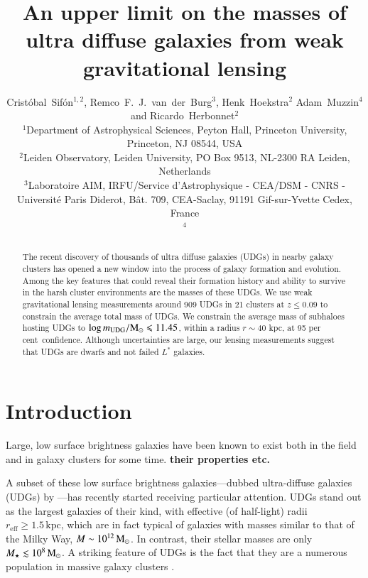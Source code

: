 \documentclass[usenatbib,fleqn]{mnras}
\title[Weak lensing masses of UDGs]{An upper limit on the masses of ultra diffuse galaxies from weak gravitational lensing}
\author[C.\ Sif\'on, R.\ F.\ J.\ van der Burg, H.\ Hoekstra, A.\ Muzzin \& R.\ Herbonnet]
  {
      Crist\'obal~Sif\'on$^{1,2}$,
      Remco~F.~J.~van~der~Burg$^3$,
      Henk~Hoekstra$^2$
      Adam~Muzzin$^4$
      and
      \newauthor
      Ricardo~Herbonnet$^2$
\\
      $^1$Department of Astrophysical Sciences, Peyton Hall, Princeton University, Princeton, NJ 08544, USA\\
      $^2$Leiden Observatory, Leiden University, PO Box 9513, NL-2300 RA Leiden, Netherlands\\
      $^3$Laboratoire AIM, IRFU/Service d'Astrophysique - CEA/DSM - CNRS - Universit\'e Paris Diderot, B\^at. 709, CEA-Saclay, 91191 Gif-sur-Yvette Cedex, France\\
      $^4$
  }
\def\percent{ per cent}
\def\reff{r_\mathrm{eff}}
\begin{document}
\label{firstpage}
\pagerange{\pageref{firstpage}--\pageref{lastpage}}

\maketitle

\begin{abstract}
        The recent discovery of thousands of ultra diffuse galaxies (UDGs) in nearby galaxy clusters has opened a new window into the process of galaxy formation and evolution. Among the key features that could reveal their formation history and ability to survive in the harsh cluster environments are the masses of these UDGs. We use weak gravitational lensing measurements around 909 UDGs in 21 clusters at $z\leq0.09$ to constrain the average total mass of UDGs. We constrain the average mass of subhaloes hosting UDGs to $\log m_{\rm UDG}/\mathrm{M}_\odot\leqslant11.45$, within a radius $r\sim40$ kpc, at 95\percent\ confidence. Although uncertainties are large, our lensing measurements suggest that UDGs are dwarfs and not failed $L^*$ galaxies.
\end{abstract}

\section{Introduction}
\label{s:intro}

Large, low surface brightness galaxies have been known to exist both in the field \citep{} and in galaxy clusters \citep{} for some time. \textbf{their properties etc.}

A subset of these low surface brightness galaxies---dubbed ultra-diffuse galaxies (UDGs) by \cite{vandokkum15_coma}---has recently started receiving particular attention. UDGs stand out as the largest galaxies of their kind, with effective (of half-light) radii $\reff\geq1.5\,\mathrm{kpc}$, which are in fact typical of galaxies with masses similar to that of the Milky Way, $M\sim10^{12}\,\mathrm{M}_\odot$. In contrast, their stellar masses are only $M_\star\lesssim10^8\,\mathrm{M}_\odot$. A striking feature of UDGs is the fact that they are a numerous population in massive galaxy clusters \citep{vandokkum15_coma,koda15,mihos15,yagi16,vdburg16}.
\end{document}
